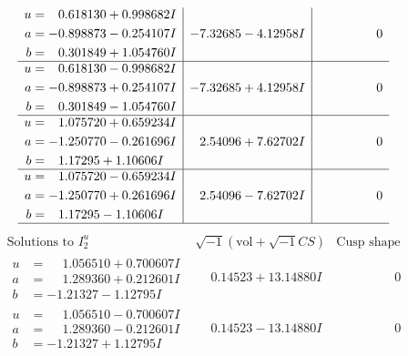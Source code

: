 \documentclass[1p]{elsarticle_modified}
\theoremstyle{definition}
\newcommand{\I}{\sqrt{-1}}
\begin{document}
$$\begin{array}{c|c|c}
\begin{aligned}
u &= \phantom{-}0.618130 + 0.998682 I \\
a &= -0.898873 - 0.254107 I \\
b &= \phantom{-}0.301849 + 1.054760 I\end{aligned}
 & -7.32685 - 4.12958 I & \phantom{-0.000000 } 0 \\ \hline\begin{aligned}
u &= \phantom{-}0.618130 - 0.998682 I \\
a &= -0.898873 + 0.254107 I \\
b &= \phantom{-}0.301849 - 1.054760 I\end{aligned}
 & -7.32685 + 4.12958 I & \phantom{-0.000000 } 0 \\ \hline\begin{aligned}
u &= \phantom{-}1.075720 + 0.659234 I \\
a &= -1.250770 - 0.261696 I \\
b &= \phantom{-}1.17295 + 1.10606 I\end{aligned}
 & \phantom{-}2.54096 + 7.62702 I & \phantom{-0.000000 } 0 \\ \hline\begin{aligned}
u &= \phantom{-}1.075720 - 0.659234 I \\
a &= -1.250770 + 0.261696 I \\
b &= \phantom{-}1.17295 - 1.10606 I\end{aligned}
 & \phantom{-}2.54096 - 7.62702 I & \phantom{-0.000000 } 0\\
 \hline 
 \end{array}$$\newpage$$\begin{array}{c|c|c}  
\text{Solutions to }I^u_{2}& \I (\text{vol} + \sqrt{-1}CS) & \text{Cusp shape}\\
 \hline 
\begin{aligned}
u &= \phantom{-}1.056510 + 0.700607 I \\
a &= \phantom{-}1.289360 + 0.212601 I \\
b &= -1.21327 - 1.12795 I\end{aligned}
 & \phantom{-}0.14523 + 13.14880 I & \phantom{-0.000000 } 0 \\ \hline\begin{aligned}
u &= \phantom{-}1.056510 - 0.700607 I \\
a &= \phantom{-}1.289360 - 0.212601 I \\
b &= -1.21327 + 1.12795 I\end{aligned}
 & \phantom{-}0.14523 - 13.14880 I & \phantom{-0.000000 } 0 \\ \hline\begin{aligned}

\end{aligned}
\end{array}$$
\end{document}
